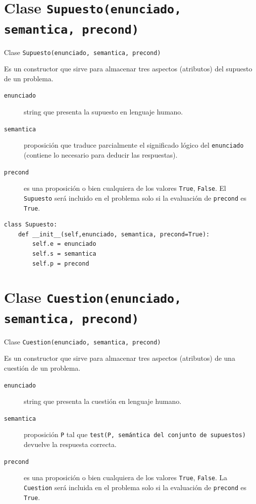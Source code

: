 \documentclass[10pt,a4paper]{report}
\begin{document}
\section{Clase \texttt{Supuesto(enunciado, semantica, precond)}}
\label{sec:org7686f17}

Clase \texttt{Supuesto(enunciado, semantica, precond)}

Es un constructor que sirve para almacenar tres aspectos (atributos) del supuesto de un problema.

\begin{description}
\item[{\texttt{enunciado}}] string que presenta la supuesto en lenguaje humano.

\item[{\texttt{semantica}}] proposición que traduce parcialmente el significado lógico del \texttt{enunciado} (contiene lo necesario para deducir las respuestas).

\item[{\texttt{precond}}] es una proposición o bien cualquiera de los valores  \texttt{True}, \texttt{False}.
El \texttt{Supuesto} será incluido en el problema solo si la evaluación de \texttt{precond} es \texttt{True}.
\end{description}
\begin{verbatim}
class Supuesto:
    def __init__(self,enunciado, semantica, precond=True):
        self.e = enunciado
        self.s = semantica
        self.p = precond
\end{verbatim}
\section{Clase \texttt{Cuestion(enunciado, semantica, precond)}}
\label{sec:org5ce1ed5}

Clase \texttt{Cuestion(enunciado, semantica, precond)}

Es un constructor que sirve para almacenar tres aspectos (atributos) de una cuestión de un problema.

\begin{description}
\item[{\texttt{enunciado}}] string que presenta la cuestión en lenguaje humano.

\item[{\texttt{semantica}}] proposición \texttt{P} tal que \texttt{test(P, semántica del conjunto de supuestos)} devuelve la respuesta correcta.

\item[{\texttt{precond}}] es una proposición o bien cualquiera de los valores \texttt{True}, \texttt{False}.
La \texttt{Cuestion} será incluida en el problema solo si la evaluación de \texttt{precond} es \texttt{True}.
\end{description}
\end{document}
